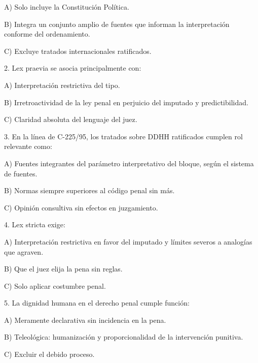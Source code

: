 \documentclass[11pt,a4paper]{article}
\begin{document}
         A) Solo incluye la Constitución Política.\par
         B) Integra un conjunto amplio de fuentes que informan la interpretación conforme del ordenamiento.\par
         C) Excluye tratados internacionales ratificados.\par



        2. Lex praevia se asocia principalmente con:\par

         A) Interpretación restrictiva del tipo.\par
         B) Irretroactividad de la ley penal en perjuicio del imputado y predictibilidad.\par
         C) Claridad absoluta del lenguaje del juez.\par



        3. En la línea de C-225/95, los tratados sobre DDHH ratificados cumplen rol relevante como:\par

         A) Fuentes integrantes del parámetro interpretativo del bloque, según el sistema de fuentes.\par
         B) Normas siempre superiores al código penal sin más.\par
         C) Opinión consultiva sin efectos en juzgamiento.\par



        4. Lex stricta exige:\par

         A) Interpretación restrictiva en favor del imputado y límites severos a analogías que agraven.\par
         B) Que el juez elija la pena sin reglas.\par
         C) Solo aplicar costumbre penal.\par



        5. La dignidad humana en el derecho penal cumple función:\par

         A) Meramente declarativa sin incidencia en la pena.\par
         B) Teleológica: humanización y proporcionalidad de la intervención punitiva.\par
         C) Excluir el debido proceso.\par
\end{document}
